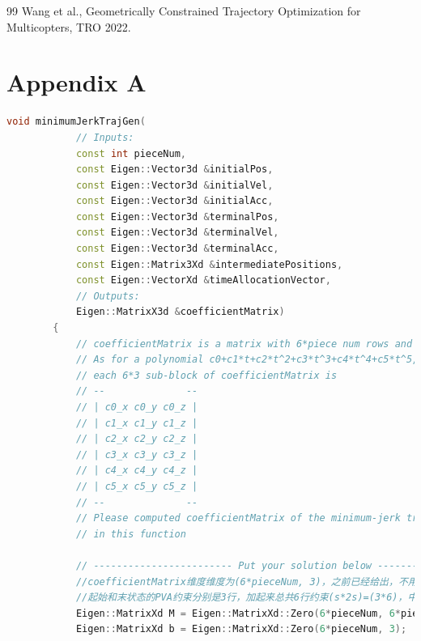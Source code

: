 \documentclass[40pt,a4paper,UTF8,twocolumn]{ctexart}%
\numberwithin{equation}{section}
\begin{document}
\begin{thebibliography}{99}  
    Wang et al., Geometrically Constrained Trajectory Optimization for Multicopters, TRO 2022.
\end{thebibliography}


\clearpage 
\onecolumn
\appendix
\section{Appendix A}

    \begin{lstlisting}[language=C++, caption=click\_gen.cpp/minimumJerkTrajGen()]
        void minimumJerkTrajGen(
            // Inputs:
            const int pieceNum,
            const Eigen::Vector3d &initialPos,
            const Eigen::Vector3d &initialVel,
            const Eigen::Vector3d &initialAcc,
            const Eigen::Vector3d &terminalPos,
            const Eigen::Vector3d &terminalVel,
            const Eigen::Vector3d &terminalAcc,
            const Eigen::Matrix3Xd &intermediatePositions,
            const Eigen::VectorXd &timeAllocationVector,
            // Outputs:
            Eigen::MatrixX3d &coefficientMatrix)
        {
            // coefficientMatrix is a matrix with 6*piece num rows and 3 columes
            // As for a polynomial c0+c1*t+c2*t^2+c3*t^3+c4*t^4+c5*t^5,
            // each 6*3 sub-block of coefficientMatrix is
            // --              --
            // | c0_x c0_y c0_z |
            // | c1_x c1_y c1_z |
            // | c2_x c2_y c2_z |
            // | c3_x c3_y c3_z |
            // | c4_x c4_y c4_z |
            // | c5_x c5_y c5_z |
            // --              --
            // Please computed coefficientMatrix of the minimum-jerk trajectory
            // in this function
        
            // ------------------------ Put your solution below ------------------------
            //coefficientMatrix维度维度为(6*pieceNum, 3)，之前已经给出，不用操作
            //起始和末状态的PVA约束分别是3行，加起来总共6行约束(s*2s)=(3*6)，中间状态有(pieceNum-1)组约束(2s*2s)=(6*6)，所以总约束仍为(2sM*2sM)=(6M*6M)
            Eigen::MatrixXd M = Eigen::MatrixXd::Zero(6*pieceNum, 6*pieceNum);
            Eigen::MatrixXd b = Eigen::MatrixXd::Zero(6*pieceNum, 3);
        

\end{lstlisting}
\end{document}
